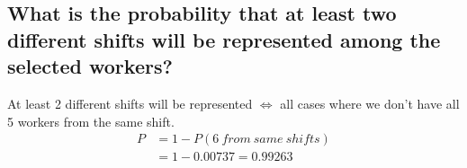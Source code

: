 \subsection{What is the probability that at least two different shifts will be represented among the selected workers?}
At least 2 different shifts will be represented \( \Leftrightarrow\) all cases where we don't have all 5 workers from the same shift.
\begin{equation}
    \begin{split}
        P & = 1 - P(6\ from\ same\ shifts) \\
          & = 1 - 0.00737 = 0.99263
    \end{split}
\end{equation}

